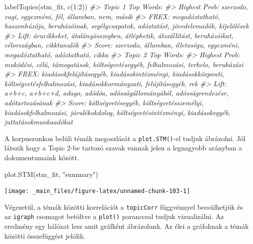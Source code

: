 \documentclass[
]{book}
\newenvironment{Shaded}{\begin{snugshade}}{\end{snugshade}}
\newcommand{\CommentTok}[1]{\textcolor[rgb]{0.56,0.35,0.01}{\textit{#1}}}
\newcommand{\DecValTok}[1]{\textcolor[rgb]{0.00,0.00,0.81}{#1}}
\newcommand{\FunctionTok}[1]{\textcolor[rgb]{0.00,0.00,0.00}{#1}}
\newcommand{\NormalTok}[1]{#1}
\newcommand{\SpecialCharTok}[1]{\textcolor[rgb]{0.00,0.00,0.00}{#1}}
\newcommand{\StringTok}[1]{\textcolor[rgb]{0.31,0.60,0.02}{#1}}
\begin{document}
\begin{Shaded}
\begin{Highlighting}[]
\FunctionTok{labelTopics}\NormalTok{(stm\_fit, }\FunctionTok{c}\NormalTok{(}\DecValTok{1}\SpecialCharTok{:}\DecValTok{2}\NormalTok{))}
\CommentTok{\#\textgreater{} Topic 1 Top Words:}
\CommentTok{\#\textgreater{}       Highest Prob: szerzodo, vagi, egyezméni, fél, államban, nem, másik }
\CommentTok{\#\textgreater{}       FREX: megadóztatható, haszonhúzója, beruházóinak, segélycsapatok, adóztatást, jövedelemadók, kijelölések }
\CommentTok{\#\textgreater{}       Lift: árucikkeket, átalányösszegben, átléphetik, átszállítást, beruházóikat, célországban, cikktanulók }
\CommentTok{\#\textgreater{}       Score: szerzodo, államban, illetoségu, egyezméni, megadóztatható, adóztatható, cikka }
\CommentTok{\#\textgreater{} Topic 2 Top Words:}
\CommentTok{\#\textgreater{}       Highest Prob: muködési, célú, támogatások, költségvetésegyéb, felhalmozási, terhelo, beruházási }
\CommentTok{\#\textgreater{}       FREX: kiadásokfelújításegyéb, kiadásokintézményi, kiadásokközponti, költségvetésfelhalmozási, kiadásokkormányzati, felújításegyéb, rek }
\CommentTok{\#\textgreater{}       Lift: a+b+c, a+b+c+d, adago, adódóa, adósságállományából, adósságrendezésr, adótartozásának }
\CommentTok{\#\textgreater{}       Score: költségvetésegyéb, költségvetésszemélyi, kiadásokfelhalmozási, járulékokdolog, költségvetésintézményi, kiadásokegyéb, juttatásokmunkaadókat}
\end{Highlighting}
\end{Shaded}

A korpuszunkon belüli témák megoszlását a \texttt{plot.STM()}-el tudjuk
ábrázolni. Jól látszik hogy a Topic 2-be tartozó szavak vannak jelen a
legnagyobb arányban a dokumentumaink között.

\begin{Shaded}
\begin{Highlighting}[]
\FunctionTok{plot.STM}\NormalTok{(stm\_fit, }\StringTok{"summary"}\NormalTok{)}
\end{Highlighting}
\end{Shaded}

\begin{center}\texttt{[image: \_main\_files/figure-latex/unnamed-chunk-103-1]} \end{center}

Végezetül, a témák közötti korrelációt a \texttt{topicCorr} függvénnyel
becsülhetjük és az \texttt{igraph} csomagot betöltve a \texttt{plot()}
paranccsal tudjuk vizualizálni. Az eredmény egy hálózat lesz amit
gráfként ábrázolunk. Az élei a gráfoknak a témák közötti összefüggést
jelölik.
\end{document}
